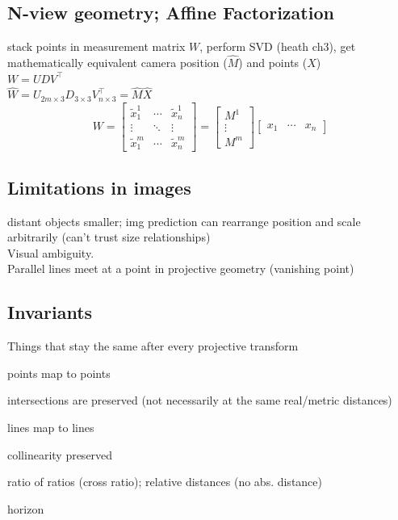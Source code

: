\documentclass{article}
\begin{document}
\subsection{N-view geometry; Affine Factorization}
stack points in measurement matrix $W$, perform SVD (heath ch3), get
mathematically equivalent camera position ($\hat M$) and points ($\hat X$)
\\
$W = UDV^\top$ \\
$\hat W = U_{2m\times 3}D_{3\times 3}V^\top_{n\times 3} = \hat M \hat X$
\[
    W = \begin{bmatrix}
        \tilde x_1^1 & \cdots & \tilde x_n^1 \\
        \vdots & \ddots & \vdots\\
        \tilde x_1^m & \cdots & \tilde x_n^m
    \end{bmatrix} = \begin{bmatrix}
        M^1 \\ \vdots \\ M^m
    \end{bmatrix}
    \begin{bmatrix}
        x_1 & \cdots & x_n
    \end{bmatrix}
\]

\subsection{Limitations in images}
distant objects smaller; img prediction can rearrange position and scale arbitrarily
(can't trust size relationships)\\
Visual ambiguity.
\\[10pt]
Parallel lines meet at a point in projective geometry (vanishing point)
\subsection{Invariants}
Things that stay the same after every projective transform
\begin{list}{-}{}
    \item points map to points
    \item intersections are preserved (not necessarily at the same real/metric distances)
    \item lines map to lines
    \item collinearity preserved
    \item ratio of ratios (cross ratio); relative distances (no abs. distance)
    \item horizon
\end{list}
\end{document}
